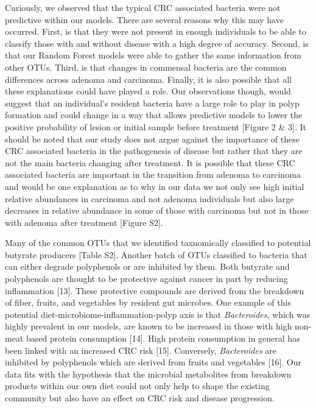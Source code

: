 \documentclass[12pt,]{article}
\begin{document}
Curiously, we observed that the typical CRC associated bacteria were not
predictive within our models. There are several reasons why this may
have occurred. First, is that they were not present in enough
individuals to be able to classify those with and without disease with a
high degree of accuracy. Second, is that our Random Forest models were
able to gather the same information from other OTUs. Third, is that
changes in commensal bacteria are the common differences across adenoma
and carcinoma. Finally, it is also possible that all these explanations
could have played a role. Our observations though, would suggest that an
individual's resident bacteria have a large role to play in polyp
formation and could change in a way that allows predictive models to
lower the positive probability of lesion or initial sample before
treatment {[}Figure 2 \& 3{]}. It should be noted that our study does
not argue against the importance of these CRC associated bacteria in the
pathogenesis of disease but rather that they are not the main bacteria
changing after treatment. It is possible that these CRC associated
bacteria are important in the transition from adenoma to carcinoma and
would be one explanation as to why in our data we not only see high
initial relative abundances in carcinoma and not adenoma individuals but
also large decreases in relative abundance in some of those with
carcinoma but not in those with adenoma after treatment {[}Figure S2{]}.

Many of the common OTUs that we identified taxnomically classified to
potential butyrate producers {[}Table S2{]}. Another batch of OTUs
classified to bacteria that can either degrade polyphenols or are
inhibited by them. Both butyrate and polyphenols are thought to be
protective against cancer in part by reducing inflammation {[}13{]}.
These protective compounds are derived from the breakdown of fiber,
fruits, and vegetables by resident gut microbes. One example of this
potential diet-microbiome-inflammation-polyp axis is that
\emph{Bacteroides}, which was highly prevalent in our models, are known
to be increased in those with high non-meat based protein consumption
{[}14{]}. High protein consumption in general has been linked with an
increased CRC risk {[}15{]}. Conversely, \emph{Bacteroides} are
inhibited by polyphenols which are derived from fruits and vegetables
{[}16{]}. Our data fits with the hypothesis that the microbial
metabolites from breakdown products within our own diet could not only
help to shape the existing community but also have an effect on CRC risk
and disease progression.
\end{document}
